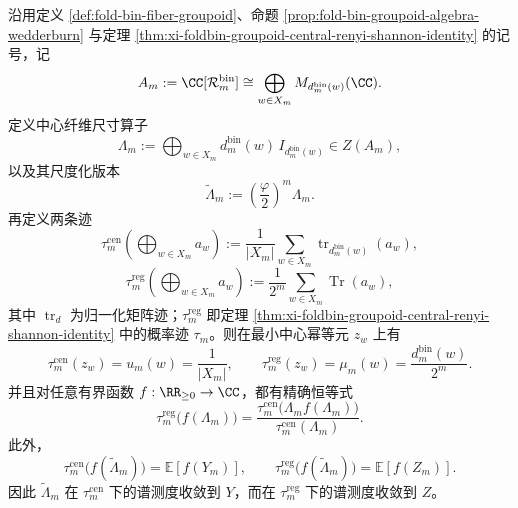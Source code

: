 \begin{theorem}[中心纤维尺寸算子在两条自然迹下的谱测度识别]\label{thm:xi-time-part60ab4-central-size-operator-two-trace-spectral-identification}
沿用定义 \ref{def:fold-bin-fiber-groupoid}、命题 \ref{prop:fold-bin-groupoid-algebra-wedderburn} 与定理 \ref{thm:xi-foldbin-groupoid-central-renyi-shannon-identity} 的记号，记
\[
A_m:=\CC[\mathcal R_m^{\mathrm{bin}}]
\cong
\bigoplus_{w\in X_m}M_{d_m^{\mathrm{bin}}(w)}(\CC).
\]
定义中心纤维尺寸算子
\[
\Lambda_m:=
\bigoplus_{w\in X_m}
d_m^{\mathrm{bin}}(w)\,I_{d_m^{\mathrm{bin}}(w)}
\in Z(A_m),
\]
以及其尺度化版本
\[
\widetilde\Lambda_m:=
\left(\frac{\varphi}{2}\right)^m\Lambda_m.
\]
再定义两条迹
\[
\tau_m^{\mathrm{cen}}\!\left(\bigoplus_{w\in X_m}a_w\right)
:=
\frac{1}{|X_m|}
\sum_{w\in X_m}\operatorname{tr}_{d_m^{\mathrm{bin}}(w)}(a_w),
\]
\[
\tau_m^{\mathrm{reg}}\!\left(\bigoplus_{w\in X_m}a_w\right)
:=
\frac{1}{2^m}
\sum_{w\in X_m}\operatorname{Tr}(a_w),
\]
其中 \(\operatorname{tr}_d\) 为归一化矩阵迹；\(\tau_m^{\mathrm{reg}}\) 即定理 \ref{thm:xi-foldbin-groupoid-central-renyi-shannon-identity} 中的概率迹 \(\tau_m\)。则在最小中心幂等元 \(z_w\) 上有
\[
\tau_m^{\mathrm{cen}}(z_w)=u_m(w)=\frac{1}{|X_m|},
\qquad
\tau_m^{\mathrm{reg}}(z_w)=\mu_m(w)=\frac{d_m^{\mathrm{bin}}(w)}{2^m}.
\]
并且对任意有界函数 \(f:\RR_{\ge 0}\to\CC\)，都有精确恒等式
\[
\tau_m^{\mathrm{reg}}\!\bigl(f(\Lambda_m)\bigr)
=
\frac{
\tau_m^{\mathrm{cen}}\!\bigl(\Lambda_m f(\Lambda_m)\bigr)
}{
\tau_m^{\mathrm{cen}}(\Lambda_m)
}.
\]
此外，
\[
\tau_m^{\mathrm{cen}}\!\bigl(f(\widetilde\Lambda_m)\bigr)
=
\mathbb E[f(Y_m)],
\qquad
\tau_m^{\mathrm{reg}}\!\bigl(f(\widetilde\Lambda_m)\bigr)
=
\mathbb E[f(Z_m)].
\]
因此 \(\widetilde\Lambda_m\) 在 \(\tau_m^{\mathrm{cen}}\) 下的谱测度收敛到 \(Y\)，而在 \(\tau_m^{\mathrm{reg}}\) 下的谱测度收敛到 \(Z\)。
\end{theorem}
